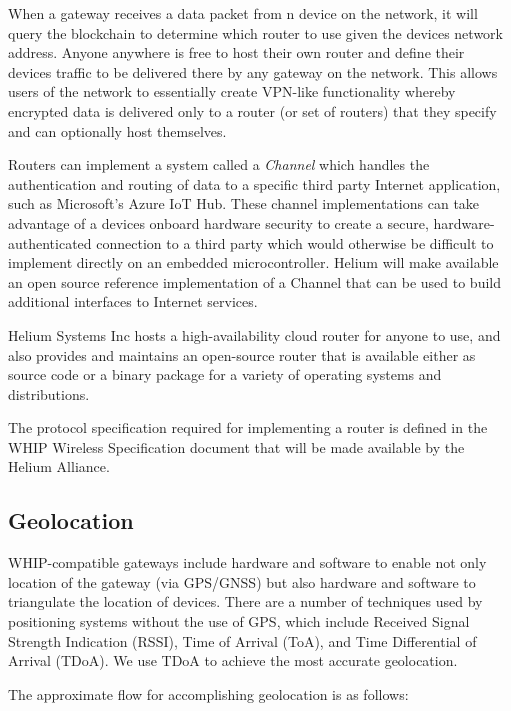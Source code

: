 \documentclass[letterpaper,11pt]{article}
\begin{document}
When a gateway receives a data packet from n device on the network, it will query the blockchain to determine which router to use given the devices network address. Anyone anywhere is free to host their own router and define their devices traffic to be delivered there by any gateway on the network. This allows users of the network to essentially create VPN-like functionality whereby encrypted data is delivered only to a router (or set of routers) that they specify and can optionally host themselves.

Routers can implement a system called a \emph{Channel} which handles the authentication and routing of data to a specific third party Internet application, such as Microsoft's Azure IoT Hub\cite{azure}. These channel implementations can take advantage of a devices onboard hardware security to create a secure, hardware-authenticated connection to a third party which would otherwise be difficult to implement directly on an embedded microcontroller. Helium will make available an open source reference implementation of a Channel that can be used to build additional interfaces to Internet services.

Helium Systems Inc hosts a high-availability cloud router for anyone to use, and also provides and maintains an open-source router that is available either as source code or a binary package for a variety of operating systems and distributions.

The protocol specification required for implementing a router is defined in the WHIP Wireless Specification document that will be made available by the Helium Alliance\cite{alliance}.

\subsection{Geolocation}\label{geolocation}

WHIP-compatible gateways include hardware and software to enable not only location of the gateway (via GPS/GNSS) but also hardware and software to triangulate the location of devices. There are a number of techniques used by positioning systems without the use of GPS, which include Received Signal Strength Indication (RSSI), Time of Arrival (ToA), and Time Differential of Arrival (TDoA). We use TDoA to achieve the most accurate geolocation.

The approximate flow for accomplishing geolocation is as follows:
\end{document}

